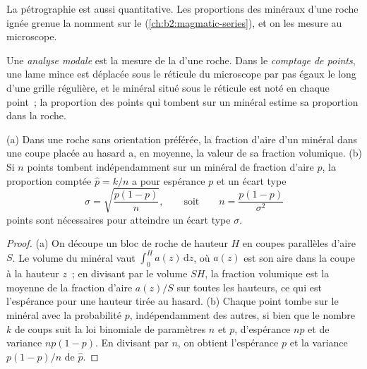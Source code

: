 La pétrographie est aussi quantitative. Les proportions des minéraux d'une roche ignée grenue
la nomment sur le  (\cref{ch:b2:magmatic-series}), et on les mesure au
microscope.

\begin{definition}\label{def:b2:field-lab-methods-2:modal}
Une \emph{analyse modale} est la mesure de la  d'une
roche. Dans le \emph{comptage de points}, une lame mince
est déplacée sous le réticule du microscope par pas égaux le long d'une grille régulière, et
le minéral situé sous le réticule est noté en chaque point~; la proportion des points qui
tombent sur un minéral estime sa proportion dans la roche.
\end{definition}

\begin{proposition}\label{prop:b2:field-lab-methods-2:counting}
(a) Dans une roche sans orientation préférée, la fraction d'aire d'un minéral dans une coupe placée
au hasard a, en moyenne, la valeur de sa fraction volumique. (b) Si $n$ points tombent indépendamment
sur un minéral de fraction d'aire $p$, la proportion comptée $\hat p = k/n$ a pour espérance $p$ et
un écart type
\begin{equation}
\sigma = \sqrt{\frac{p(1-p)}{n}} , \qquad\text{soit}\qquad n = \frac{p(1-p)}{\sigma^2}
\label{eq:b2:field-lab-methods-2:binomial}
\end{equation}
points sont nécessaires pour atteindre un écart type $\sigma$.
\end{proposition}

\begin{proof}
(a) On découpe un bloc de roche de hauteur $H$ en coupes parallèles d'aire $S$. Le volume du
minéral vaut $\int_0^H a(z)\,\mathrm{d}z$, où $a(z)$ est son aire dans la coupe à la hauteur $z$~;
en divisant par le volume $SH$, la fraction volumique est la moyenne de la fraction d'aire $a(z)/S$ sur
toutes les hauteurs, ce qui est l'espérance pour une hauteur tirée au hasard. (b) Chaque point tombe sur le
minéral avec la probabilité $p$, indépendamment des autres, si bien que le nombre $k$ de coups suit la
loi binomiale de paramètres $n$ et $p$, d'espérance $np$ et de variance $np(1-p)$. En divisant par
$n$, on obtient l'espérance $p$ et la variance $p(1-p)/n$ de $\hat p$.
\end{proof}

